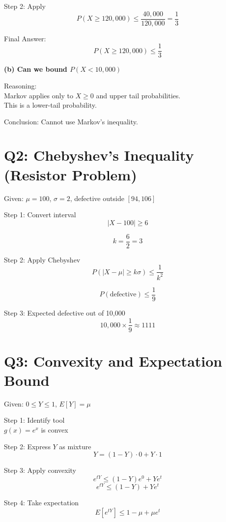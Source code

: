 \documentclass[11pt]{article}
\begin{document}
Step 2: Apply
\[
P(X \ge 120{,}000) \le \frac{40{,}000}{120{,}000} = \frac{1}{3}
\]

Final Answer:
\[
P(X \ge 120{,}000) \le \frac{1}{3}
\]

\textbf{(b) Can we bound $P(X < 10{,}000)$}

Reasoning: \\
Markov applies only to $X \ge 0$ and upper tail probabilities. \\
This is a lower-tail probability.

Conclusion: Cannot use Markov’s inequality.

\vspace{0.5cm}

\section*{Q2: Chebyshev’s Inequality (Resistor Problem)}

Given: $\mu = 100$, $\sigma = 2$, defective outside $[94,106]$

Step 1: Convert interval
\[
|X - 100| \ge 6
\]

\[
k = \frac{6}{2} = 3
\]

Step 2: Apply Chebyshev
\[
P(|X - \mu| \ge k\sigma) \le \frac{1}{k^2}
\]

\[
P(\text{defective}) \le \frac{1}{9}
\]

Step 3: Expected defective out of 10,000
\[
10{,}000 \times \frac{1}{9} \approx 1111
\]

\vspace{0.5cm}

\section*{Q3: Convexity and Expectation Bound}

Given: $0 \le Y \le 1$, $E[Y] = \mu$

Step 1: Identify tool \\
$g(x) = e^x$ is convex

Step 2: Express $Y$ as mixture
\[
Y = (1-Y)\cdot 0 + Y \cdot 1
\]

Step 3: Apply convexity
\[
e^{tY} \le (1-Y)e^0 + Y e^t
\]
\[
e^{tY} \le (1-Y) + Y e^t
\]

Step 4: Take expectation
\[
E[e^{tY}] \le 1 - \mu + \mu e^t
\]

\vspace{0.5cm}
\end{document}
